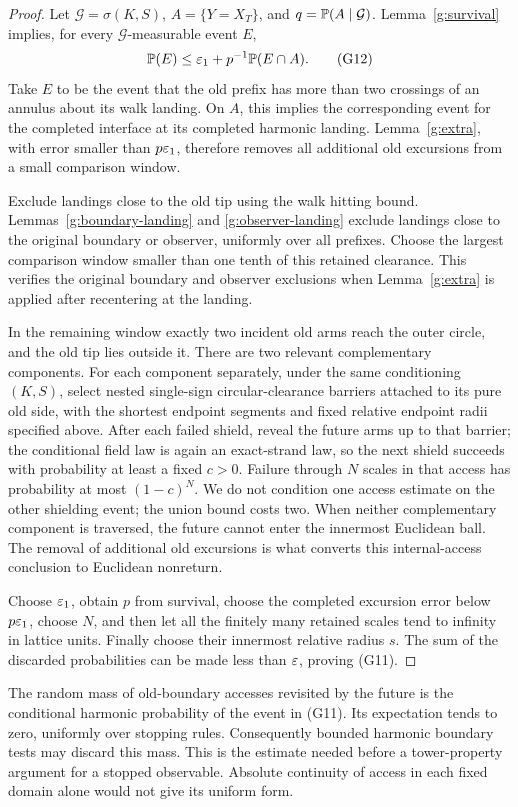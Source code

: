 \begin{proof}
Let \(\mathcal G=\sigma(K,S)\), \(A=\{Y=X_T\}\), and
\(q=\mathbb P(A\mid\mathcal G)\). Lemma~\ref{g:survival} implies,
for every \(\mathcal G\)-measurable event \(E\),
\[
 \mathbb P(E)\leq\varepsilon_1+p^{-1}\mathbb P(E\cap A).              \tag{G12}
\]
Take \(E\) to be the event that the old prefix has more than two
crossings of an annulus about its walk landing. On \(A\), this
implies the corresponding event for the completed interface at
its completed harmonic landing. Lemma~\ref{g:extra}, with error
smaller than \(p\varepsilon_1\), therefore removes all additional old
excursions from a small comparison window.

Exclude landings close to the old tip using the walk hitting bound.
Lemmas~\ref{g:boundary-landing} and \ref{g:observer-landing} exclude
landings close to the original boundary or observer, uniformly over
all prefixes. Choose the largest comparison window smaller than
one tenth of this retained clearance. This verifies the original
boundary and observer exclusions when Lemma~\ref{g:extra} is applied
after recentering at the landing.

In the remaining window exactly two incident old arms reach the
outer circle, and the old tip lies outside it. There are two
relevant complementary components. For each component separately,
under the same conditioning \((K,S)\), select nested single-sign
circular-clearance barriers attached to its pure old side, with
the shortest endpoint segments and fixed relative endpoint radii
specified above. After each failed shield, reveal the future arms
up to that barrier; the conditional field law is again an
exact-strand law, so the next shield succeeds with probability at
least a fixed \(c>0\). Failure through \(N\) scales in that access
has probability at most \((1-c)^N\). We do not condition one access
estimate on the other shielding event; the union bound costs two.
When neither complementary component is traversed, the future
cannot enter the innermost Euclidean ball. The removal of
additional old excursions is what converts this internal-access
conclusion to Euclidean nonreturn.

Choose \(\varepsilon_1\), obtain \(p\) from survival, choose the completed
excursion error below \(p\varepsilon_1\), choose \(N\), and then let all
the finitely many retained scales tend to infinity in lattice
units. Finally choose their innermost relative radius \(s\).
The sum of the discarded probabilities can be made less than
\(\varepsilon\), proving (G11).
\end{proof}

\begin{remark}
The random mass of old-boundary accesses revisited by the future is
the conditional harmonic probability of the event in (G11).
Its expectation tends to zero, uniformly over stopping rules.
Consequently bounded harmonic boundary tests may discard this mass.
This is the estimate needed before a tower-property argument for a
stopped observable. Absolute continuity of access in each fixed domain
alone would not give its uniform form.
\end{remark}
